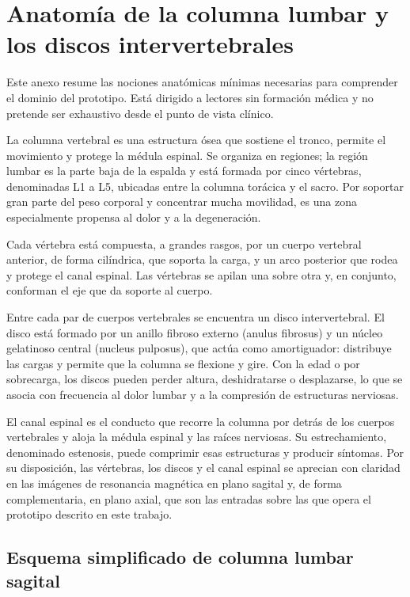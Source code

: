 \chapter{Anatomía de la columna lumbar y los discos intervertebrales}
\label{anexo:anatomia-lumbar}

Este anexo resume las nociones anatómicas mínimas necesarias para comprender el dominio del prototipo. Está dirigido a lectores sin formación médica y no pretende ser exhaustivo desde el punto de vista clínico.

La columna vertebral es una estructura ósea que sostiene el tronco, permite el movimiento y protege la médula espinal. Se organiza en regiones; la región lumbar es la parte baja de la espalda y está formada por cinco vértebras, denominadas L1 a L5, ubicadas entre la columna torácica y el sacro. Por soportar gran parte del peso corporal y concentrar mucha movilidad, es una zona especialmente propensa al dolor y a la degeneración.

Cada vértebra está compuesta, a grandes rasgos, por un cuerpo vertebral anterior, de forma cilíndrica, que soporta la carga, y un arco posterior que rodea y protege el canal espinal. Las vértebras se apilan una sobre otra y, en conjunto, conforman el eje que da soporte al cuerpo.

Entre cada par de cuerpos vertebrales se encuentra un disco intervertebral. El disco está formado por un anillo fibroso externo (anulus fibrosus) y un núcleo gelatinoso central (nucleus pulposus), que actúa como amortiguador: distribuye las cargas y permite que la columna se flexione y gire. Con la edad o por sobrecarga, los discos pueden perder altura, deshidratarse o desplazarse, lo que se asocia con frecuencia al dolor lumbar y a la compresión de estructuras nerviosas.

El canal espinal es el conducto que recorre la columna por detrás de los cuerpos vertebrales y aloja la médula espinal y las raíces nerviosas. Su estrechamiento, denominado estenosis, puede comprimir esas estructuras y producir síntomas. Por su disposición, las vértebras, los discos y el canal espinal se aprecian con claridad en las imágenes de resonancia magnética en plano sagital y, de forma complementaria, en plano axial, que son las entradas sobre las que opera el prototipo descrito en este trabajo.

\section{Esquema simplificado de columna lumbar sagital}

